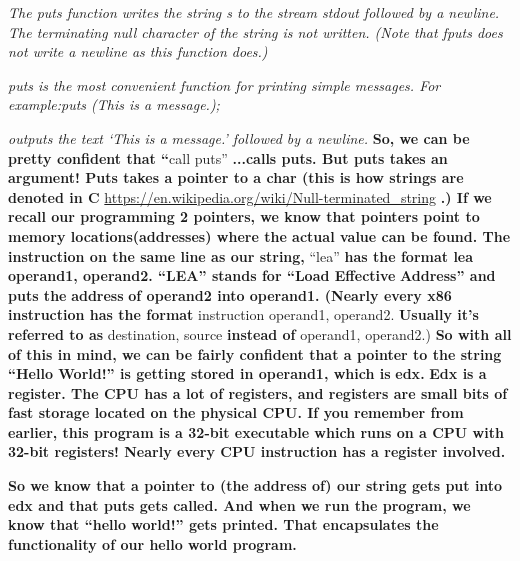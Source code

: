 \documentclass[letterpaper]{article}
\newcommand{\sitfig}[3]{
\begin{figure}[H]
\centering
\makebox[\textwidth][c]{
#2
}
\label{#1}
\end{figure}
}
\newcommand{\sitgfx}[4][scale=1.0]{
\sitfig{#3}{\texttt{[image: \#2]}}{#4}
}
\begin{document}
\textit{The puts function writes the string s to the stream stdout followed by a newline. The terminating null character
of the string is not written. (Note that fputs does not write a newline as this function does.)}

\textit{puts is the most convenient function for printing simple messages. \newline
For example:puts ({\textquotedbl}This is a message.{\textquotedbl});}

\textit{outputs the text `This is a message.' followed by a newline.\newline
\newline
}\textbf{So, we can be pretty confident that ``}call puts'' \textbf{...calls puts. But puts takes an argument! Puts
takes a pointer to a char (this is how strings are denoted in C
}\url{https://en.wikipedia.org/wiki/Null-terminated_string}\textbf{ .) If we recall our programming 2 pointers, we know
that pointers point to memory locations(}\textbf{\textcolor[rgb]{0.21960784,0.4627451,0.11372549}{addresses}}\textbf{)
where the actual value can be found. \newline
The instruction on the same line as our string, }{}``lea''\textbf{ has the format lea operand1, operand2. ``LEA'' stands
for ``Load Effective }\textbf{\textcolor[rgb]{0.21960784,0.4627451,0.11372549}{Address}}\textbf{{}'' and puts the
}\textbf{\textcolor[rgb]{0.21960784,0.4627451,0.11372549}{address}}\textbf{ of operand2 into operand1. (Nearly every
x86 instruction has the format }instruction operand1, operand2. \textbf{Usually it's referred to as }destination,
source\textbf{ instead of }operand1, operand2.)\textbf{  \newline
So with all of this in mind, we can be fairly confident that a pointer to the string ``Hello World!'' is getting stored
in operand1, which is }\textbf{\textcolor[rgb]{0.21960784,0.4627451,0.11372549}{edx}}\textbf{.
}\textbf{\textcolor[rgb]{0.21960784,0.4627451,0.11372549}{Edx }}\textbf{is a
}\textbf{\textcolor[rgb]{0.21960784,0.4627451,0.11372549}{register}}\textbf{. The CPU has a lot of registers, and
registers are small bits of fast storage located on the physical CPU. If you remember from earlier, this program is a
32-bit executable which runs on a CPU with 32-bit registers! Nearly every CPU instruction has a register involved.}

{\centering
  
\sitgfx[width=1.9583in,height=1.8752in]{FINALWORKINGDOCFORMERLYPRECURSOR-img011.png}{fig:unk}{TODO CAPTION}
 \par}
\textbf{So we know that a pointer to (the address of) our string gets put into edx and that puts gets called. And when
we run the program, we know that ``hello world!'' gets printed. That encapsulates the functionality of our hello world
program. }
\end{document}

